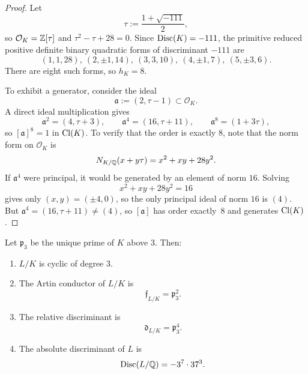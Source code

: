 \begin{proof}
Let
\[
\tau:=\frac{1+\sqrt{-111}}{2},
\]
so \(\mathcal O_K=\mathbb{Z}[\tau]\) and \(\tau^2-\tau+28=0\). Since \(\operatorname{Disc}(K)=-111\), the primitive reduced positive definite binary quadratic forms of discriminant \(-111\) are
\[
(1,1,28),\ (2,\pm 1,14),\ (3,3,10),\ (4,\pm 1,7),\ (5,\pm 3,6).
\]
There are eight such forms, so \(h_K=8\).

To exhibit a generator, consider the ideal
\[
\mathfrak a:=(2,\tau-1)\subset \mathcal O_K.
\]
A direct ideal multiplication gives
\[
\mathfrak a^2=(4,\tau+3),\qquad
\mathfrak a^4=(16,\tau+11),\qquad
\mathfrak a^8=(1+3\tau),
\]
so \([\mathfrak a]^8=1\) in \(\operatorname{Cl}(K)\). To verify that the order is exactly \(8\), note that the norm form on \(\mathcal O_K\) is
\[
N_{K/\mathbb{Q}}(x+y\tau)=x^2+xy+28y^2.
\]
If \(\mathfrak a^4\) were principal, it would be generated by an element of norm \(16\). Solving
\[
x^2+xy+28y^2=16
\]
gives only \((x,y)=(\pm 4,0)\), so the only principal ideal of norm \(16\) is \((4)\). But \(\mathfrak a^4=(16,\tau+11)\neq (4)\), so \([\mathfrak a]\) has order exactly~\(8\) and generates \(\operatorname{Cl}(K)\).
\end{proof}

\begin{theorem}\label{thm:conductor}
Let \(\mathfrak p_3\) be the unique prime of \(K\) above \(3\). Then:
\begin{enumerate}
\item[(i)] \(L/K\) is cyclic of degree \(3\).
\item[(ii)] The Artin conductor of \(L/K\) is
\[
\mathfrak f_{L/K}=\mathfrak p_3^2.
\]
\item[(iii)] The relative discriminant is
\[
\mathfrak d_{L/K}=\mathfrak p_3^4.
\]
\item[(iv)] The absolute discriminant of \(L\) is
\[
\operatorname{Disc}(L/\mathbb{Q})=-3^7\cdot 37^3.
\]
\end{enumerate}
\end{theorem}

